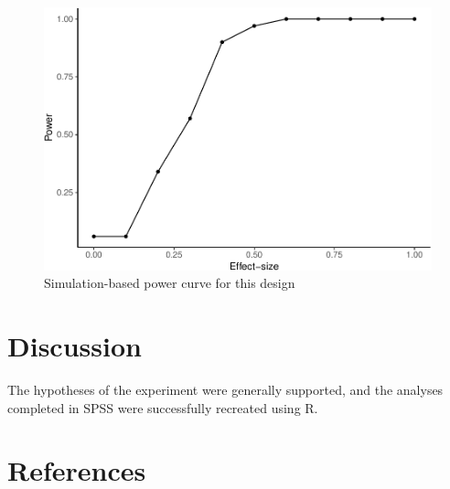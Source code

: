 \documentclass[man]{apa6}
\begin{document}
\begin{figure}
\centering
\includegraphics{APA_Report_files/figure-latex/powerfig-1.pdf}
\caption{\label{fig:powerfig}Simulation-based power curve for this design}
\end{figure}

\section{Discussion}\label{discussion}

The hypotheses of the experiment were generally supported, and the
analyses completed in SPSS were successfully recreated using R.

\newpage

\section{References}\label{references}

\begingroup
\setlength{\parindent}{-0.5in} \setlength{\leftskip}{0.5in}

\hypertarget{refs}{}

\endgroup
\end{document}
